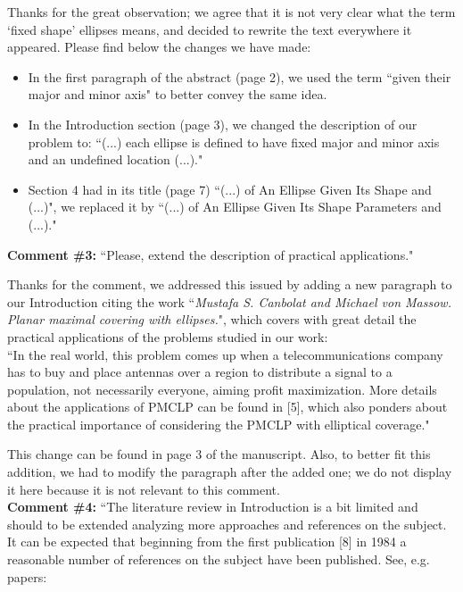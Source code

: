 		Thanks for the great observation; we agree that it is not very clear what the term `fixed shape' ellipses means, and decided to rewrite the text everywhere it appeared. Please find below the changes we have made:
		\begin{itemize}
			\item In the first paragraph of the abstract (page 2), we used the term ``given their major and minor axis" to better convey the same idea.
			
			\item In the Introduction section (page 3), we changed the description of our problem to: ``(...) each ellipse is defined to have fixed major and minor axis and an undefined location (...)."
			
			\item Section 4 had in its title (page 7) ``(...) of An Ellipse Given Its Shape and (...)", we replaced it by ``(...) of An Ellipse Given Its Shape Parameters and (...)."
		\end{itemize}
		
		\textbf{Comment \#3:} ``Please, extend the description of practical applications."
		
		Thanks for the comment, we addressed this issued by adding a new paragraph to our Introduction citing the work ``\textit{Mustafa S. Canbolat and Michael von Massow. Planar maximal covering with ellipses.}", which covers with great detail the practical applications of the problems studied in our work:
		\\
		
		``In the real world, this problem comes up when a telecommunications company has to buy and
		place antennas over a region to distribute a signal to a population, not necessarily everyone, aiming
		profit maximization. More details about the applications of PMCLP can be found in [5], which also
		ponders about the practical importance of considering the PMCLP with elliptical coverage."
		
		This change can be found in page 3 of the manuscript. Also, to better fit this addition, we had to modify the paragraph after the added one; we do not display it here because it is not relevant to this comment.
		\\
		
		\textbf{Comment \#4:} ``The literature review in Introduction is a bit limited and should to be extended analyzing more approaches and references on the subject. It can be expected that beginning from the first publication [8] in 1984 a reasonable number of references on the subject have been published. See, e.g. papers:
		
